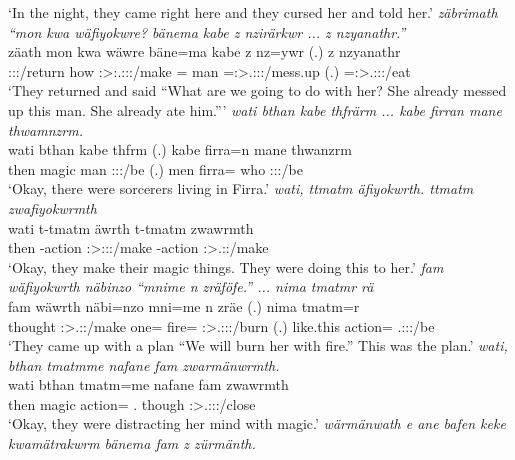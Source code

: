 \begin{exe}
	\trans `In the night, they came right here and they cursed her and told her.'
	\emph{zäbrimath ``mon kwa wäfiyokwre? bänema kabe z nzirärkwr ... z nzyanathr.''}\\
	\gll zäath mon kwa wäwre bäne=ma kabe z nz=ywr (.) z nzyanathr\\
	\Stpl:\Sbj:\Pst:\Pfv/return how {\Fut} \Fpl:\Sbj>:\Tsg.\F:\Obj:\Nonpast:\Ipfv/make \Recog={\Char} man {\Iam} \Immpst=\Stsg:\Sbj>\Tsg.\Masc:\Obj:\Nonpast:\Ipfv/mess.up (.) {\Iam} \Immpst=\Stsg:\Sbj>\Tsg.\Masc:\Obj:\Nonpast:\Ipfv/eat\\
	\trans `They returned and said ``What are we going to do with her? She already messed up this man. She already ate him.'''
	\emph{wati bthan kabe thfrärm ... kabe firran mane thwamnzrm.}\\
	\gll wati bthan kabe thfrm (.) kabe firra=n mane thwanzrm\\
	then magic man \Stpl:\Sbj:\Pst:\Dur/be (.) men firra={\Loc} who \Stpl:\Sbj:\Pst:\Dur/be\\
	\trans `Okay, there were sorcerers living in Firra.'
	\emph{wati, ttmatm äfiyokwrth. ttmatm zwafiyokwrmth}\\
	\gll wati t-tmatm äwrth t-tmatm zwawrmth\\
	then \Redup-action \Stpl:\Sbj>\Stpl:\Obj:\Nonpast:\Ipfv/make \Redup-action \Stpl:\Sbj>\Tsg.\F:\Pst:\Dur/make\\
	\trans `Okay, they make their magic things. They were doing this to her.'
	\emph{fam wäfiyokwrth näbinzo ``mnime n zräföfe.'' ... nima tmatmr rä}\\
	\gll fam wäwrth näbi=nzo mni=me n zräe (.) nima tmatm=r \\
	thought \Stpl:\Sbj>\Tsg.\F:\Nonpast:\Ipfv/make one={\Only} fire={\Ins} {\Imn} \Fpl:\Sbj>\Tsg.\F:\Obj:\Irr:\Pfv/burn (.) {like.this} action={\Purp} \Tsg.\F:\Sbj:\Nonpast:\Ipfv/be\\
	\trans `They came up with a plan ``We will burn her with fire.'' This was the plan.'	
	\emph{wati, bthan tmatmme nafane fam zwarmänwrmth.}\\
	\gll wati bthan tmatm=me nafane fam zwawrmth\\
	then magic action={\Ins} \Tsg.{\Poss} though \Stpl:\Sbj>\Tsg.\F:\Io:\Pst:\Dur/close\\
	\trans `Okay, they were distracting her mind with magic.'
	\emph{wärmänwath e ane bafen keke kwamätrakwrm bänema fam z zürmänth.}\\

\end{exe}
